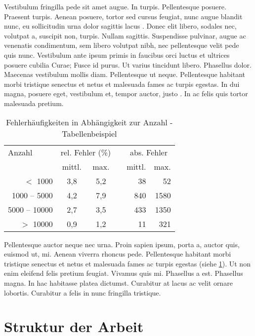 Vestibulum fringilla pede sit amet augue. In turpis. Pellentesque posuere. Praesent turpis. Aenean posuere, tortor sed cursus feugiat, nunc augue blandit nunc, eu sollicitudin urna dolor sagittis lacus \cite{Lammel.2012}. Donec elit libero, sodales nec, volutpat a, suscipit non, turpis. Nullam sagittis. Suspendisse pulvinar, augue ac venenatis condimentum, sem libero volutpat nibh, nec pellentesque velit pede quis nunc. Vestibulum ante ipsum primis in faucibus orci luctus et ultrices posuere cubilia Curae; Fusce id purus. Ut varius tincidunt libero. Phasellus dolor. Maecenas vestibulum mollis diam. Pellentesque ut neque. Pellentesque habitant morbi tristique senectus et netus et malesuada fames ac turpis egestas. In dui magna, posuere eget, vestibulum et, tempor auctor, justo \cite{Kelly.2008}. In ac felis quis tortor malesuada pretium. 

\begin{table} [ht]
\centering
	\begin{tabular}{rcccrr}
		\toprule
		\multicolumn{1}{l}{Anzahl}&
		\multicolumn{2}{c}{rel. Fehler (\%)}&&
		\multicolumn{2}{c}{abs. Fehler}\\
		\cmidrule{2-3}
		\cmidrule{5-6}
		& mittl. & max. && mittl. & max. \\
		\midrule
		$<$ 1000      & 3,8 & 5,2 && 38 & 52\\
		1000 -- 5000  & 4,2 & 7,9 && 840 & 1580\\
		5000 -- 10000 & 2,7 & 3,5 && 433 & 1350\\
		$>$ 10000     & 0,9 & 1,2 && 11 & 321\\
		\bottomrule
	\end{tabular}
	\caption[Hier steht die TabellenCaption]{Fehlerhäufigkeiten in Abhängigkeit zur Anzahl - Tabellenbeispiel}
	\label{tab:Auswertungskategorien}
\end{table}

Pellentesque auctor neque nec urna. Proin sapien ipsum, porta a, auctor quis, euismod ut, mi. Aenean viverra rhoncus pede. Pellentesque habitant morbi tristique senectus et netus et malesuada fames ac turpis egestas (siehe \ref{tab:Auswertungskategorien}). Ut non enim eleifend felis pretium feugiat. Vivamus quis mi. Phasellus a est. Phasellus magna. In hac habitasse platea dictumst. Curabitur at lacus ac velit ornare lobortis. Curabitur a felis in nunc fringilla tristique.

\section{Struktur der Arbeit}

